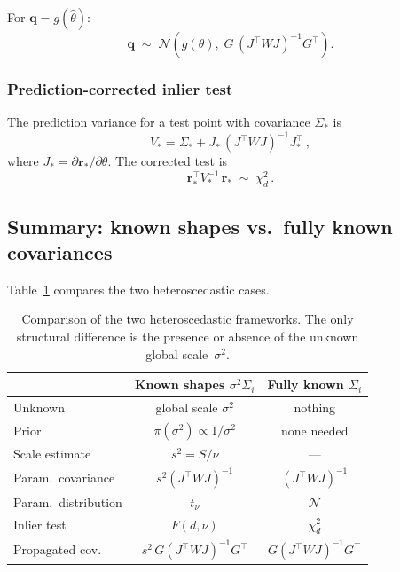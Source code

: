 \documentclass[11pt]{article}
\newcommand{\Normal}{\mathcal{N}}
\begin{document}
For $\mathbf{q} = g(\hat\theta)$:
\begin{equation}
  \boxed{
    \mathbf{q} \;\sim\; \Normal\!\left(g(\theta),\;
      G\, (J^\top W J)^{-1} G^\top\right).
  }
\end{equation}

\subsubsection{Prediction-corrected inlier test}

The prediction variance for a test point with covariance $\Sigma_*$ is
\begin{equation}
  V_* = \Sigma_* + J_*\, (J^\top W J)^{-1} J_*^\top\,,
\end{equation}
where $J_* = \partial \mathbf{r}_* / \partial \theta$.
The corrected test is
\begin{equation}
  \boxed{
    \mathbf{r}_*^\top V_*^{-1}\, \mathbf{r}_*
    \;\sim\; \chi^2_d\,.
  }
\end{equation}

\subsection{Summary: known shapes vs.\ fully known covariances}

Table~\ref{tab:het-comparison} compares the two heteroscedastic cases.

\begin{table}[h]
\centering
\begin{tabular}{lcc}
  \toprule
  & Known shapes $\sigma^2\Sigma_i$ & Fully known $\Sigma_i$ \\
  \midrule
  Unknown & global scale $\sigma^2$ & nothing \\
  Prior & $\pi(\sigma^2) \propto 1/\sigma^2$ & none needed \\
  Scale estimate & $s^2 = S/\nu$ & --- \\
  Param.\ covariance & $s^2(J^\top W J)^{-1}$ & $(J^\top W J)^{-1}$ \\
  Param.\ distribution & $t_\nu$ & $\Normal$ \\
  Inlier test & $F(d, \nu)$ & $\chi^2_d$ \\
  Propagated cov. & $s^2\, G(J^\top W J)^{-1}G^\top$ & $G(J^\top W J)^{-1}G^\top$ \\
  \bottomrule
\end{tabular}
\caption{Comparison of the two heteroscedastic frameworks.
  The only structural difference is the presence or absence of the
  unknown global scale~$\sigma^2$.}
\label{tab:het-comparison}
\end{table}
\end{document}
